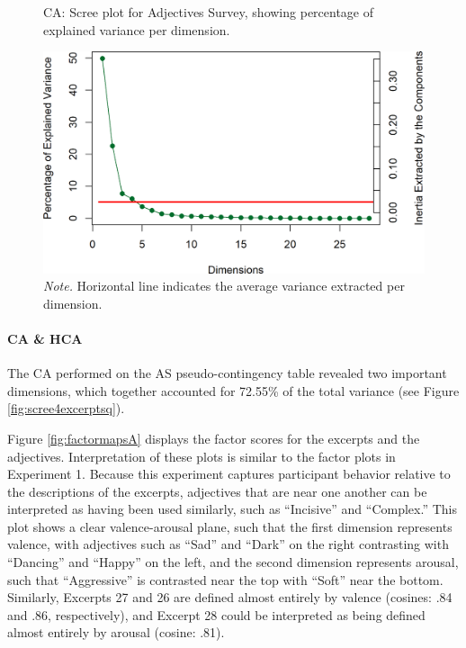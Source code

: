 \documentclass[
  english,
  man,floatsintext]{apa6}
\let\oldparagraph\paragraph
\renewcommand{\paragraph}[1]{\oldparagraph{#1}\mbox{}}
\begin{document}
\begin{figure}  
  \begin{center}
  \caption{CA: Scree plot for Adjectives Survey, showing percentage of explained variance per dimension.}
    \includegraphics{./Music-Descriptor-Space_files/figure-latex/scree4descriptorscode-1.png}
  \caption*{\footnotesize \textit{Note.} Horizontal line indicates the average variance extracted per dimension. }\label{fig:scree4descriptors}  
 \end{center}
\end{figure}

\hypertarget{ca-hca}{%
\paragraph{CA \& HCA}\label{ca-hca}}

The CA performed on the AS pseudo-contingency table revealed two important dimensions, which together accounted for 72.55\% of the total variance (see Figure \ref{fig:scree4excerptsq}).

Figure \ref{fig:factormapsA} displays the factor scores for the excerpts and the adjectives. Interpretation of these plots is similar to the factor plots in Experiment 1. Because this experiment captures participant behavior relative to the descriptions of the excerpts, adjectives that are near one another can be interpreted as having been used similarly, such as ``Incisive'' and ``Complex.'' This plot shows a clear valence-arousal plane, such that the first dimension represents valence, with adjectives such as ``Sad'' and ``Dark'' on the right contrasting with ``Dancing'' and ``Happy'' on the left, and the second dimension represents arousal, such that ``Aggressive'' is contrasted near the top with ``Soft'' near the bottom. Similarly, Excerpts 27 and 26 are defined almost entirely by valence (cosines: .84 and .86, respectively), and Excerpt 28 could be interpreted as being defined almost entirely by arousal (cosine: .81).
\end{document}
